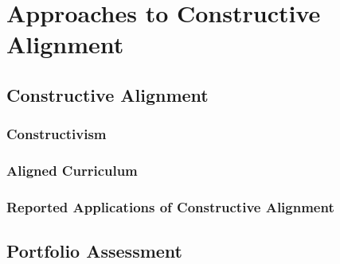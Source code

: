
\chapter{Approaches to Constructive Alignment} %
\label{cha:background}

\section{Constructive Alignment} %
\label{sec:constructive_alignment}

\subsection{Constructivism} %
\label{sub:constructivism}


\subsection{Aligned Curriculum} %
\label{sub:aligned_curriculum}


\subsection{Reported Applications of Constructive Alignment} %
\label{sub:reported_applications_of_constructive_alignment}



\section{Portfolio Assessment} %
\label{sec:portfolio_assessment}





